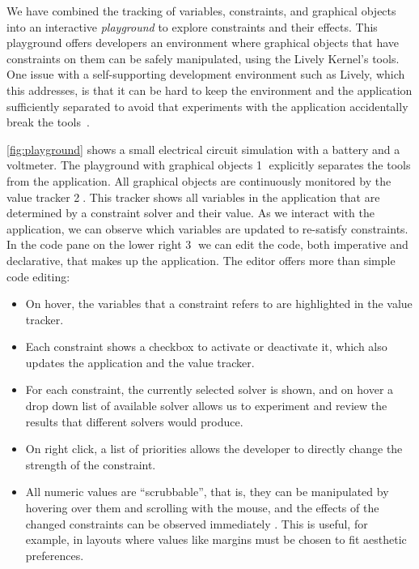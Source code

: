 We have combined the tracking of variables, constraints, and graphical objects
into an interactive \emph{playground} to explore constraints and their
effects. This playground offers developers an environment where graphical
objects that have constraints on them can be safely manipulated, using the
Lively Kernel's tools. One issue with a self-supporting development environment
such as Lively, which this addresses, is that it can be hard to keep the
environment and the application sufficiently separated to avoid that experiments
with the application accidentally break the tools~\cite{lincke-phd}.

\autoref{fig:playground} shows a small electrical circuit simulation with a
battery and a voltmeter. The playground with graphical objects \textcircled{1}
explicitly separates the tools from the application. All graphical objects are
continuously monitored by the value tracker \textcircled{2}. This tracker shows
all variables in the application that are determined by a constraint solver and
their value. As we interact with the application, we can observe which variables
are updated to re-satisfy constraints. In the code pane on the lower right
\textcircled{3} we can edit the code, both imperative and declarative, that
makes up the application. The editor offers more than simple code editing:
\begin{itemize}
\item On hover, the variables that a constraint refers to are highlighted in the
  value tracker.
\item Each constraint shows a checkbox to activate or deactivate it, which also
  updates the application and the value tracker.
\item For each constraint, the currently selected solver is shown, and on hover
  a drop down list of available solver allows us to experiment and review the
  results that different solvers would produce.
\item On right click, a list of priorities allows the developer to directly
  change the strength of the constraint.
\item All numeric values are ``scrubbable'', that is, they can be manipulated by
  hovering over them and scrolling with the mouse, and the effects of the
  changed constraints can be observed immediately%
  . This is useful, for example, in layouts where values like margins
  must be chosen to fit aesthetic preferences.
\end{itemize}

